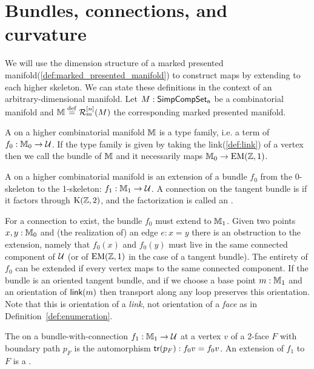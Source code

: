 \section{Bundles, connections, and curvature}

We will use the dimension structure of a marked presented manifold(\ref{def:marked_presented_manifold}) to construct maps by extending to each higher skeleton. We can state these definitions in the context of an arbitrary-dimensional manifold. Let \( M:\mathsf{SimpCompSet_n} \) be a combinatorial manifold and \( \mathbb{M}\stackrel{\mathrm{def}}{=} \mathcal{R}_m^{[n]}(M) \) the corresponding marked presented manifold.

\begin{mydef}
\label{def:bundle}
A  on a higher combinatorial manifold \( \mathbb{M} \) is a type family, i.e. a term of \( f_0:\mathbb{M}_0 \to \mathcal{U} \). If the type family is given by taking the link(\ref{def:link}) of a vertex then we call the bundle  of \( \mathbb{M} \) and it necessarily maps \( \mathbb{M}_0\to\mathrm{EM}(\mathbb{Z},1) \).
\end{mydef}

\begin{mydef}
\label{def:connection}
A  on a higher combinatorial manifold is an extension of a bundle \( f_0 \) from the 0-skeleton to the 1-skeleton: \( f_1:\mathbb{M}_1\to\mathcal{U} \). A connection on the tangent bundle is  if it factors through \( \mathrm{K}(\mathbb{Z},2) \), and the factorization is called an .
\end{mydef}

For a connection to exist, the bundle \( f_0 \) must extend to \( \mathbb{M}_1 \). Given two points \( x,y:\mathbb{M}_0 \) and (the realization of) an edge \( e:x=y \) there is an obstruction to the extension, namely that \( f_0(x) \) and \( f_0(y) \) must live in the same connected component of \( \mathcal{U} \) (or of \( \mathrm{EM}(\mathbb{Z},1) \) in the case of a tangent bundle). The entirety of \( f_0 \) can be extended if every vertex maps to the same connected component. If the bundle is an oriented tangent bundle, and if we choose a base point \( m:\mathbb{M}_1 \) and an orientation of \( \operatorname{\mathsf{link}}(m) \) then transport along any loop preserves this orientation. Note that this is orientation of a \emph{link}, not orientation of a \emph{face} as in Definition~\ref{def:enumeration}.

\begin{mydef}
\label{def:curvature}
The  on a bundle-with-connection \( f_1:\mathbb{M}_1\to\mathcal{U} \) at a vertex \( v \) of a 2-face \( F \) with boundary path \( p_F \) is the automorphism \( \mathsf{tr}(p_F):f_0v=f_0v \). An extension of \( f_1 \) to \( F \) is a .
\end{mydef}

